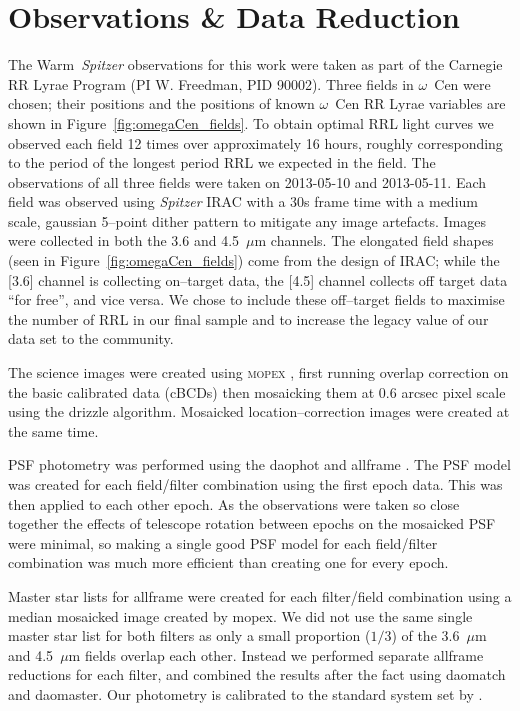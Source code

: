 \documentclass[a4paper,fleqn,usenatbib]{mnras}
\begin{document}
\section{Observations \& Data Reduction}
\label{sec:observations}
The Warm~\textit{Spitzer} observations for this work were taken as part of the Carnegie RR Lyrae Program (PI W. Freedman, PID 90002). Three fields in $\omega$~Cen were chosen; their positions and the positions of known $\omega$~Cen RR Lyrae variables are shown in Figure~\ref{fig:omegaCen_fields}. To obtain optimal RRL light curves we observed each field 12 times over approximately 16 hours, roughly corresponding to the period of the longest period RRL we expected in the field. The observations of all three fields were taken on 2013-05-10 and 2013-05-11. Each field was observed using {\it Spitzer} IRAC \citep{2004ApJS..154...10F} with a 30s frame time with a medium scale, gaussian 5--point dither pattern to mitigate any image artefacts. Images were collected in both the 3.6 and 4.5~$\mu$m channels. 
The elongated field shapes (seen in Figure~\ref{fig:omegaCen_fields}) come from the design of IRAC; while the [3.6] channel is collecting on--target data, the [4.5] channel collects off target data ``for free'', and vice versa. We chose to include these off--target fields to maximise the number of RRL in our final sample and to increase the legacy value of our data set to the community. 

The science images were created using \textsc{mopex} \citep{2006SPIE.6274E..0CM}, first running overlap correction on the basic calibrated data (cBCDs) then mosaicking them at 0.6 arcsec pixel scale using the drizzle algorithm. Mosaicked location--correction images were created at the same time. 

PSF photometry was performed using the {\sc daophot} and {\sc allframe} \citep{1987PASP...99..191S, 1994PASP..106..250S}. The PSF model was created for each field/filter combination using the first epoch data. This was then applied to each other epoch. As the observations were taken so close together the effects of telescope rotation between epochs on the mosaicked PSF were minimal, so making a single good PSF model for each field/filter combination was much more efficient than creating one for every epoch. 

Master star lists for {\sc allframe} were created for each filter/field combination using a median mosaicked image created by {\sc mopex}. We did not use the same single master star list for both filters as only a small proportion ($1/3$) of the 3.6~$\mu$m and 4.5~$\mu$m fields overlap each other. Instead we performed separate {\sc allframe} reductions for each filter, and combined the results after the fact using {\sc daomatch} and {\sc daomaster}. Our photometry is calibrated to the standard system set by \citet{2005PASP..117..978R}.
\end{document}
